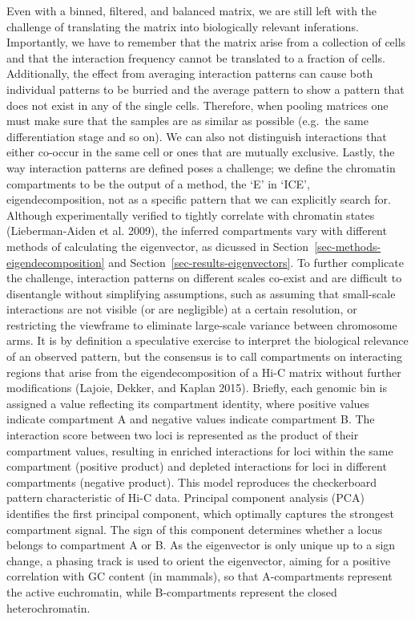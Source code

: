\documentclass[
  11pt,
  a4paper,
]{scrbook}
\begin{document}
Even with a binned, filtered, and balanced matrix, we are still left
with the challenge of translating the matrix into biologically relevant
inferations. Importantly, we have to remember that the matrix arise from
a collection of cells and that the interaction frequency cannot be
translated to a fraction of cells. Additionally, the effect from
averaging interaction patterns can cause both individual patterns to be
burried and the average pattern to show a pattern that does not exist in
any of the single cells. Therefore, when pooling matrices one must make
sure that the samples are as similar as possible (e.g.~the same
differentiation stage and so on). We can also not distinguish
interactions that either co-occur in the same cell or ones that are
mutually exclusive. Lastly, the way interaction patterns are defined
poses a challenge; we define the chromatin compartments to be the output
of a method, the `E' in `ICE', eigendecomposition, not as a specific
pattern that we can explicitly search for. Although experimentally
verified to tightly correlate with chromatin states (Lieberman-Aiden et
al. 2009), the inferred compartments vary with different methods of
calculating the eigenvector, as dicussed in
Section~\ref{sec-methods-eigendecomposition} and
Section~\ref{sec-results-eigenvectors}. To further complicate the
challenge, interaction patterns on different scales co-exist and are
difficult to disentangle without simplifying assumptions, such as
assuming that small-scale interactions are not visible (or are
negligible) at a certain resolution, or restricting the viewframe to
eliminate large-scale variance between chromosome arms. It is by
definition a speculative exercise to interpret the biological relevance
of an observed pattern, but the consensus is to call compartments on
interacting regions that arise from the eigendecomposition of a Hi-C
matrix without further modifications (Lajoie, Dekker, and Kaplan 2015).
Briefly, each genomic bin is assigned a value reflecting its compartment
identity, where positive values indicate compartment A and negative
values indicate compartment B. The interaction score between two loci is
represented as the product of their compartment values, resulting in
enriched interactions for loci within the same compartment (positive
product) and depleted interactions for loci in different compartments
(negative product). This model reproduces the checkerboard pattern
characteristic of Hi-C data. Principal component analysis (PCA)
identifies the first principal component, which optimally captures the
strongest compartment signal. The sign of this component determines
whether a locus belongs to compartment A or B. As the eigenvector is
only unique up to a sign change, a phasing track is used to orient the
eigenvector, aiming for a positive correlation with GC content (in
mammals), so that A-compartments represent the active euchromatin, while
B-compartments represent the closed heterochromatin.
\end{document}
